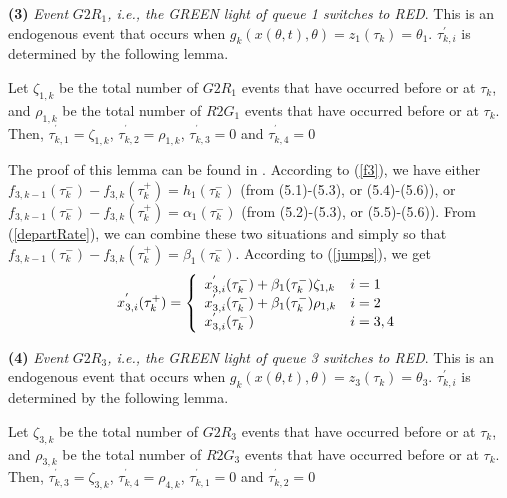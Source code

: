 \documentclass{ifacconf}\usepackage{graphicx}
\begin{document}
\textbf{(3)} \emph{Event }$G2R_{1}$\emph{, i.e., the GREEN light of queue 1
switches to RED}. This is an endogenous event that occurs when $g_{k}(x(\theta,t),\theta)=z_{1}(\tau_{k})=\theta_{1}$. $\tau_{k,i}^{\prime}$ is
determined by the following lemma.

\begin{lem}
Let $\zeta_{1,k}$ be the total number of $G2R_1$ events that have occurred before or at $\tau_{k}$, and $\rho_{1,k}$ be the total number of $R2G_1$ events that have occurred before or at $\tau_{k}$. Then, $\tau_{k,1}^{^{\prime }}= \zeta_{1,k}$, $\tau_{k,2}^{^{\prime }}= \rho_{1,k}$, $\tau_{k,3}^{^{\prime }}=0$ and $\tau_{k,4}^{^{\prime }}=0$
\label{lemma1}
\end{lem}

The proof of this lemma can be found in \cite{GengCDC12}. According to
(\ref{f3}), we have either $f_{3,k-1}(\tau_{k}^{-})-f_{3,k}(\tau_{k}^{+})=h_{1}(\tau_{k}^{-})$ (from (5.1)-(5.3), or (5.4)-(5.6)), or
$f_{3,k-1}(\tau_{k}^{-})-f_{3,k}(\tau_{k}^{+})=\alpha_{1}(\tau_{k}^{-})$ (from
(5.2)-(5.3), or (5.5)-(5.6)). From (\ref{departRate}), we can combine these
two situations and simply so that $f_{3,k-1}(\tau_{k}^{-})-f_{3,k}(\tau
_{k}^{+})=\beta_{1}(\tau_{k}^{-})$. According to (\ref{jumps}), we get
\begin{equation}
x_{3,i}^{^{\prime}}(\tau_{k}^{+})=\left\{
\begin{array}
[c]{ll}x_{3,i}^{^{\prime}}(\tau_{k}^{-})+\beta_{1}(\tau_{k}^{-})\zeta_{1,k} & i=1\\
x_{3,i}^{^{\prime}}(\tau_{k}^{-})+\beta_{1}(\tau_{k}^{-})\rho_{1,k} & i=2\\
x_{3,i}^{^{\prime}}(\tau_{k}^{-}) & i=3,4
\end{array}
\right.  \label{type3di}\end{equation}


\textbf{(4)} \emph{Event }$G2R_{3}$\emph{, i.e., the GREEN light of queue 3
switches to RED}. This is an endogenous event that occurs when $g_{k}(x(\theta,t),\theta)=z_{3}(\tau_{k})=\theta_{3}$. $\tau_{k,i}^{\prime}$ is
determined by the following lemma.

\begin{lem}
Let $\zeta_{3,k}$ be the total number of $G2R_3$ events that have occurred before or at $\tau_{k}$, and $\rho_{3,k}$ be the total number of $R2G_3$ events that have occurred before or at $\tau_{k}$. Then, $\tau_{k,3}^{^{\prime }}= \zeta_{3,k}$, $\tau_{k,4}^{^{\prime }}= \rho_{4,k}$, $\tau_{k,1}^{^{\prime }}=0$ and $\tau_{k,2}^{^{\prime }}=0$
\label{lemma1}
\end{lem}
\end{document}
